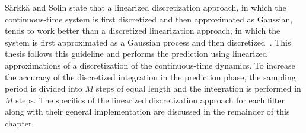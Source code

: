 \documentclass[../zhang_thesis.tex]{subfiles}
\begin{document}
S\"arkk\"a and Solin state that a linearized discretization approach, in which the continuous-time system is first discretized and then approximated as Gaussian, tends to work better than a discretized linearization approach, in which the system is first approximated as a Gaussian process and then discretized~\cite{sarkka12}. This thesis follows this guideline and performs the prediction using linearized approximations of a discretization of the continuous-time dynamics. To increase the
accuracy of the discretized integration in the prediction phase, the sampling period is divided into $M$ steps of equal length and the integration is performed in $M$ steps. The specifics of the linearized discretization approach for each filter along with their general implementation are discussed in the remainder of this chapter.
\end{document}
